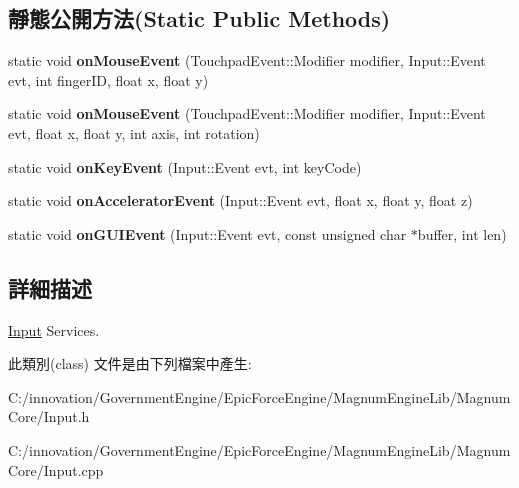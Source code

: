 \subsection*{靜態公開方法(Static Public Methods)}
\begin{DoxyCompactItemize}
\item 
static void {\bfseries on\+Mouse\+Event} (Touchpad\+Event\+::\+Modifier modifier, Input\+::\+Event evt, int finger\+ID, float x, float y)\hypertarget{class_i_dream_sky_1_1_input_a9e4984faa8e4443e49d73155830deb25}{}\label{class_i_dream_sky_1_1_input_a9e4984faa8e4443e49d73155830deb25}

\item 
static void {\bfseries on\+Mouse\+Event} (Touchpad\+Event\+::\+Modifier modifier, Input\+::\+Event evt, float x, float y, int axis, int rotation)\hypertarget{class_i_dream_sky_1_1_input_a640a6e0f9b0bf1df5f82d277516369ab}{}\label{class_i_dream_sky_1_1_input_a640a6e0f9b0bf1df5f82d277516369ab}

\item 
static void {\bfseries on\+Key\+Event} (Input\+::\+Event evt, int key\+Code)\hypertarget{class_i_dream_sky_1_1_input_a76cc21a9ef286a6d45852b76198b48d5}{}\label{class_i_dream_sky_1_1_input_a76cc21a9ef286a6d45852b76198b48d5}

\item 
static void {\bfseries on\+Accelerator\+Event} (Input\+::\+Event evt, float x, float y, float z)\hypertarget{class_i_dream_sky_1_1_input_a505f1f7de69f9f060bc32dec5f311951}{}\label{class_i_dream_sky_1_1_input_a505f1f7de69f9f060bc32dec5f311951}

\item 
static void {\bfseries on\+G\+U\+I\+Event} (Input\+::\+Event evt, const unsigned char $\ast$buffer, int len)\hypertarget{class_i_dream_sky_1_1_input_adf76ad18fb523c5527ef9cf4fba4a89b}{}\label{class_i_dream_sky_1_1_input_adf76ad18fb523c5527ef9cf4fba4a89b}

\end{DoxyCompactItemize}


\subsection{詳細描述}
\hyperlink{class_i_dream_sky_1_1_input}{Input} Services. 

此類別(class) 文件是由下列檔案中產生\+:\begin{DoxyCompactItemize}
\item 
C\+:/innovation/\+Government\+Engine/\+Epic\+Force\+Engine/\+Magnum\+Engine\+Lib/\+Magnum\+Core/Input.\+h\item 
C\+:/innovation/\+Government\+Engine/\+Epic\+Force\+Engine/\+Magnum\+Engine\+Lib/\+Magnum\+Core/Input.\+cpp\end{DoxyCompactItemize}
